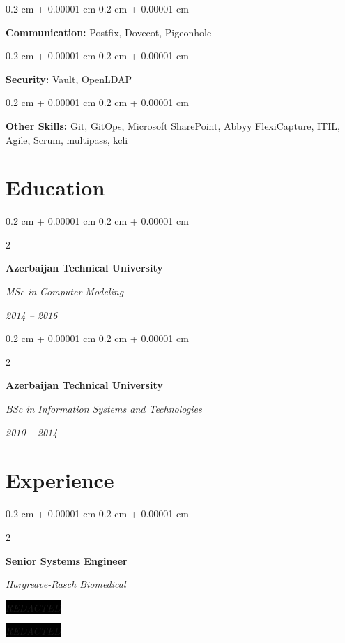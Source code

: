 \documentclass[10pt, letterpaper]{article}
\newenvironment{onecolentry}{
  \begin{adjustwidth}{
      0.2 cm + 0.00001 cm
    }{
      0.2 cm + 0.00001 cm
    }
  }{
  \end{adjustwidth}
} %
\newenvironment{twocolentry}[2][]{
  \onecolentry
  \def\secondColumn{#2}
  \setcolumnwidth{\fill, 4.5 cm}
  \begin{paracol}{2}
  }{
    \switchcolumn \raggedleft \secondColumn
  \end{paracol}
  \endonecolentry
} %
\begin{document}

\begin{onecolentry}
  \textbf{Communication:} Postfix, Dovecot, Pigeonhole
\end{onecolentry}


\begin{onecolentry}
	\textbf{Security:} Vault, OpenLDAP
\end{onecolentry}


\begin{onecolentry}
  \textbf{Other Skills:} Git, GitOps, Microsoft SharePoint, Abbyy FlexiCapture,
  ITIL, Agile, Scrum, multipass, kcli
\end{onecolentry}

\section{Education}

\begin{twocolentry}{

  \textit{2014 – 2016}}
  \textbf{Azerbaijan Technical University}

  \textit{MSc in Computer Modeling}
\end{twocolentry}

\vspace{0.3 cm}

\begin{twocolentry}{
  \textit{2010 – 2014}}
  \textbf{Azerbaijan Technical University}

  \textit{BSc in Information Systems and Technologies}
\end{twocolentry}

\section{Experience}

\begin{twocolentry}{
		\textit{\color{white}\colorbox{black}{REDACTED}\\}
		
		\textit{\color{white}\colorbox{black}{REDACTED}\\}}
	\textbf{Senior Systems Engineer}
	
	\textit{Hargreave-Rasch Biomedical}
\end{twocolentry}
\end{document}
